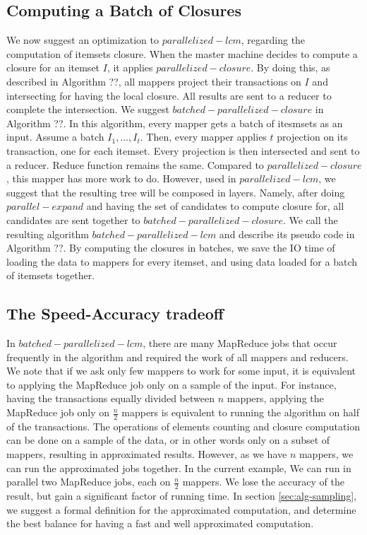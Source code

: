 \subsection{Computing a Batch of Closures}
We now suggest an optimization to $parallelized-lcm$,
regarding the computation of itemsets closure. When the
master machine decides to compute a closure for an itemset
$I$, it applies $parallelized-closure$. By doing this, as
described in Algorithm ??, all mappers project their
transactions on $I$ and intersecting for having the local
closure. All results are sent to a reducer to complete the
intersection. We suggest $batched-parallelized-closure$ in
Algorithm ??. In this algorithm, every mapper gets a
batch of itesmsets as an input. Assume a batch
${I_1,\ldots,I_t}$. Then, every mapper applies $t$
projection on its transaction, one for each itemset. Every
projection is then intersected and sent to a reducer. Reduce
function remains the same. Compared to
$parallelized-closure$, this mapper has more work to do.
However, used in $parallelized-lcm$, we suggest that the
resulting tree will be composed in layers. Namely, after
doing $parallel-expand$ and having the set of candidates to
compute closure for, all candidates are sent together to
$batched-parallelized-closure$. We call the resulting
algorithm $batched-parallelized-lcm$ and describe its pseudo
code in Algorithm ??. By computing the closures in batches,
we save the IO time of loading the data to mappers for every
itemset, and using data loaded for a batch of itemsets
together.

\subsection{The Speed-Accuracy tradeoff}
In $batched-parallelized-lcm$, there are many MapReduce jobs
that occur frequently in the algorithm and required the work
of all mappers and reducers. We note that if we ask only few
mappers to work for some input, it is equivalent to applying
the MapReduce job only on a sample of the input. For
instance, having the transactions equally divided between
$n$ mappers, applying the MapReduce job only on
$\frac{n}{2}$ mappers is equivalent to running the algorithm on half of
the transactions. The operations of elements counting and
closure computation can be done on a sample of the
data, or in other words only on a subset of mappers,
resulting in approximated results. However, as we
have $n$ mappers, we can run the approximated jobs
together. In the current example, We can run in
parallel two MapReduce jobs, each on $\frac{n}{2}$
mappers. We lose the accuracy of the result, but gain
a significant factor of running time. In section
\ref{sec:alg-sampling}, we suggest a formal
definition for the approximated computation, and
determine the best balance for having a fast
and well approximated computation.